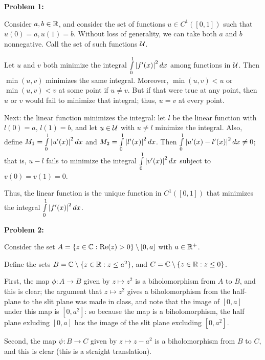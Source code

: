 \documentclass[a4paper,12pt]{article}
\begin{document}
{\bf Problem 1:} %

Consider $a, b \in \mathbb{R}$, and consider the set of functions $u \in C^1([0,1])$ such that $u(0)=a, u(1)=b$. Without loss of generality, we can take both $a$ and $b$ nonnegative. Call the set of such functions $\mathcal{U}$. %

Let $u$ and $v$ both minimize the integral $\int\limits_0^1 \left\lvert f'(x) \right\rvert^2 dx$ among functions in $\mathcal{U}$. Then $\min(u,v)$ minimizes the same integral. %
Moreover, $\min(u,v) < u$ or $\min(u,v) < v$ at some point if $u \neq v$. But if that were true at any point, then $u$ or $v$ would fail to minimize that integral; thus, $u = v$ at every point.

Next: the linear function minimizes the integral: let $l$ be the linear function with $l(0) = a$, $l(1)=b$, and let $u \in \mathcal{U}$ with $u \neq l$ minimize the integral. Also, define $M_1 = \int\limits_0^1 \left\lvert u'(x) \right\rvert^2 dx$ and $M_2 = \int\limits_0^1 \left\lvert l'(x) \right\rvert^2 dx$. Then $\int\limits_0^1 \left\lvert u'(x)-l'(x) \right\rvert^2 dx \neq 0$; that is, $u-l$ fails to minimize the integral $\int\limits_0^1 \left\lvert v'(x) \right\rvert^2 dx$ subject to $v(0)=v(1)=0$. %

Thus, the linear function is the unique function in $C^1([0,1])$ that minimizes the integral $\int\limits_0^1 \left\lvert f'(x) \right\rvert^2 dx$.

\shunt

{\bf Problem 2:}

Consider the set $A=\{z \in \mathbb{C}: \text{Re}(z) >0\} \setminus [0,a]$ with $a \in \mathbb{R}^+$.

Define the sets $B = \mathbb{C} \setminus \{z \in \mathbb{R}: z \leq a^2\}$, and $C = \mathbb{C} \setminus \{z \in \mathbb{R}: z \leq 0\}$.

First, the map $\phi: A \to B$ given by $z \mapsto z^2$ is a biholomorphism from $A$ to $B$, and this is clear; the argument that $z \mapsto z^2$ gives a biholomorphism from the half-plane to the slit plane was made in class, and note that the image of $[0,a]$ under this map is $[0,a^2]$: so because the map is a biholomorphism, the half plane exluding $[0,a]$ has the image of the slit plane excluding $[0,a^2]$.

Second, the map $\psi: B \to C$ given by $z \mapsto z-a^2$ is a biholomorphism from $B$ to $C$, and this is clear (this is a straight translation).
\end{document}
